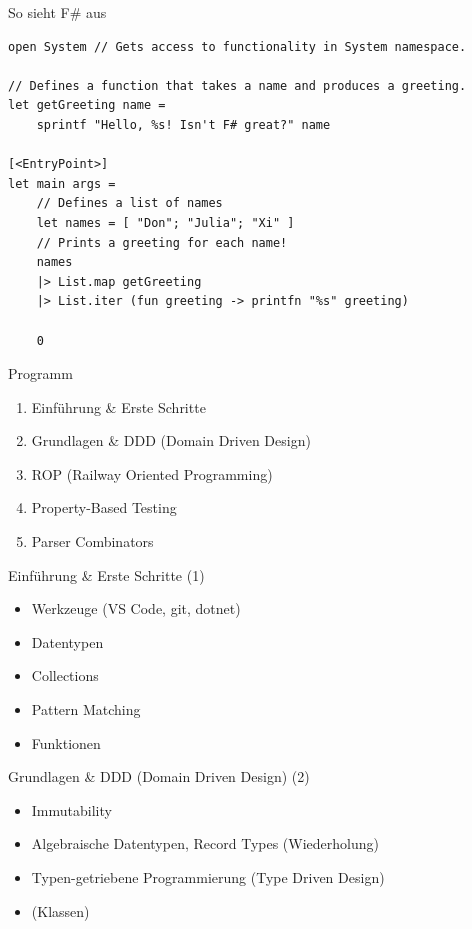 \documentclass[t]{beamer}
\begin{document}
\begin{frame}[label={sec:orgb19d5e4},fragile]{So sieht F\# aus}
 \begin{verbatim}
open System // Gets access to functionality in System namespace.

// Defines a function that takes a name and produces a greeting.
let getGreeting name =
    sprintf "Hello, %s! Isn't F# great?" name

[<EntryPoint>]
let main args =
    // Defines a list of names
    let names = [ "Don"; "Julia"; "Xi" ]
    // Prints a greeting for each name!
    names
    |> List.map getGreeting
    |> List.iter (fun greeting -> printfn "%s" greeting)

    0
\end{verbatim}
\end{frame}

\begin{frame}[label={sec:orgd3e4043}]{Programm}
\begin{enumerate}
\item Einführung \& Erste Schritte
\item Grundlagen \& DDD (Domain Driven Design)
\item ROP (Railway Oriented Programming)
\item Property-Based Testing
\item Parser Combinators
\end{enumerate}
\end{frame}

\begin{frame}[label={sec:orge7aea0b}]{Einführung \& Erste Schritte (1)}
\begin{itemize}
\item Werkzeuge (VS Code, git, dotnet)
\item Datentypen
\item Collections
\item Pattern Matching
\item Funktionen
\end{itemize}
\end{frame}

\begin{frame}[label={sec:org779f805}]{Grundlagen \& DDD (Domain Driven Design) (2)}
\begin{itemize}
\item Immutability
\item Algebraische Datentypen, Record Types (Wiederholung)
\item Typen-getriebene Programmierung (Type Driven Design)
\item (Klassen)
\end{itemize}
\end{frame}
\end{document}

